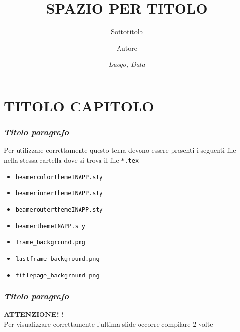 \documentclass{beamer}
\title{SPAZIO PER TITOLO}
\subtitle{Sottotitolo}
\date[]{\textsl{Luogo, Data}}
\author[]{Autore}
\begin{document}
\begin{frame}
\titlepage
\end{frame}

\section{TITOLO CAPITOLO}

\begin{frame} 
\frametitle{\textit{Titolo paragrafo}}
Per utilizzare correttamente questo tema devono essere presenti i seguenti file nella stessa cartella dove si trova il file \texttt{*.tex}\\[1ex]
\begin{itemize}
\item \texttt{beamercolorthemeINAPP.sty}
\item \texttt{beamerinnerthemeINAPP.sty}
\item \texttt{beamerouterthemeINAPP.sty}
\item \texttt{beamerthemeINAPP.sty}
\item \texttt{frame\_background.png}
\item \texttt{lastframe\_background.png}
\item \texttt{titlepage\_background.png}
\end{itemize}
\end{frame}


\begin{frame} 
\frametitle{\textit{Titolo paragrafo}}
\textbf{ATTENZIONE!!!}\\[1ex]
Per visualizzare correttamente l'ultima slide occorre compilare 2 volte
\end{frame}


\lastframe
\end{document}
